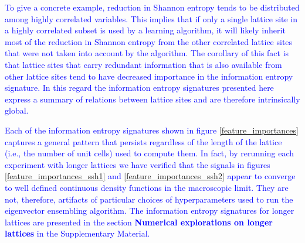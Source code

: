 \documentclass[10pt]{revtex4-1}
\begin{document}
\textcolor{blue}{To give a concrete example, reduction in Shannon entropy tends to be distributed among highly correlated variables. This implies that if only a single lattice site in a highly correlated subset is used by a learning algorithm, it will likely inherit most of the reduction in Shannon entropy from the other correlated lattice sites that were not taken into account by the algorithm. The corollary of this fact is that lattice sites that carry redundant information that is also available from other lattice sites tend to have decreased importance in the information entropy signature.  In this regard the information entropy signatures presented here express a summary of relations between lattice sites and are therefore intrinsically global.} 


\textcolor{blue}{Each of the information entropy signatures shown in figure \ref{feature_importances} captures a general pattern that persists regardless of the length of the lattice (i.e., the number of unit cells) used to compute them. In fact, by rerunning each experiment with longer lattices we have verified that the signals in figures \ref{feature_importances_ssh1} and \ref{feature_importances_ssh2} appear to converge to well defined continuous density functions in the macroscopic limit. They are not, therefore, artifacts of particular choices of hyperparameters used to run the eigenvector ensembling algorithm. The information entropy signatures for longer lattices are presented in the section \textbf{Numerical explorations on longer lattices} in the Supplementary Material.}


\end{document}
